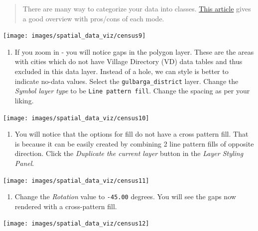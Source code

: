 \documentclass[
  12pt,
  a4paper]{article}
\providecommand{\tightlist}{%
  \setlength{\itemsep}{0pt}\setlength{\parskip}{0pt}}
\begin{document}
\begin{quote}
There are many way to categorize your data into classes.
\href{https://gisgeography.com/choropleth-maps-data-classification/}{This
article} gives a good overview with pros/cons of each mode.
\end{quote}

\begin{center}\texttt{[image: images/spatial\_data\_viz/census9]} \end{center}

\begin{enumerate}
\def\labelenumi{\arabic{enumi}.}
\setcounter{enumi}{9}
\tightlist
\item
  If you zoom in - you will notice gaps in the polygon layer. These are
  the areas with cities which do not have Village Directory (VD) data
  tables and thus excluded in this data layer. Instead of a hole, we can
  style is better to indicate no-data values. Select the
  \texttt{gulbarga\_district} layer. Change the \emph{Symbol layer type}
  to be \texttt{Line\ pattern\ fill}. Change the spacing as per your
  liking.
\end{enumerate}

\begin{center}\texttt{[image: images/spatial\_data\_viz/census10]} \end{center}

\begin{enumerate}
\def\labelenumi{\arabic{enumi}.}
\setcounter{enumi}{10}
\tightlist
\item
  You will notice that the options for fill do not have a cross pattern
  fill. That is because it can be easily created by combining 2 line
  pattern fills of opposite direction. Click the \emph{Duplicate the
  current layer} button in the \emph{Layer Styling Panel}.
\end{enumerate}

\begin{center}\texttt{[image: images/spatial\_data\_viz/census11]} \end{center}

\begin{enumerate}
\def\labelenumi{\arabic{enumi}.}
\setcounter{enumi}{11}
\tightlist
\item
  Change the \emph{Rotation} value to \texttt{-45.00} degrees. You will
  see the gaps now rendered with a cross-pattern fill.
\end{enumerate}

\begin{center}\texttt{[image: images/spatial\_data\_viz/census12]} \end{center}
\end{document}
